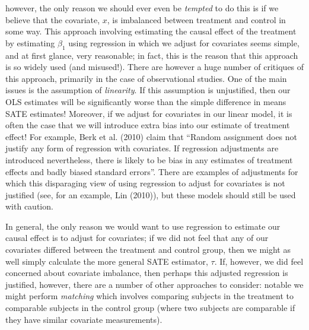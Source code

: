 however, the only reason we should ever even be \textit{tempted} to do this is if we believe that the covariate, $x$, is imbalanced between treatment and control in some way. This approach involving estimating the causal effect of the treatment by estimating $\beta_1$ using regression in which we adjust for covariates seems simple, and at first glance, very reasonable; in fact, this is the reason that this approach is so widely used (and misused!). There are however a huge number of critiques of this approach, primarily in the case of observational studies. One of the main issues is the assumption of \textit{linearity}. If this assumption is unjustified, then our OLS estimates will be significantly worse than the simple difference in means SATE estimates! Moreover, if we adjust for covariates in our linear model, it is often the case that we will introduce extra bias into our estimate of treatment effect! For example, Berk et al. (2010) claim that ``Random assignment does not justify any form of regression with covariates. If regression adjustments are introduced nevertheless, there is likely to be bias in any estimates of treatment effects and badly biased standard errors''. There are examples of adjustments for which this disparaging view of using regression to adjust for covariates is not justified (see, for an example, Lin (2010)), but these models should still be used with caution.

In general, the only reason we would want to use regression to estimate our causal effect is to adjust for covariates; if we did not feel that any of our covariates differed between the treatment and control group, then we might as well simply calculate the more general SATE estimator, $\tau$. If, however, we did feel concerned about covariate imbalance, then perhaps this adjusted regression is justified, however, there are a number of other approaches to consider: notable we might perform \textit{matching} which involves comparing subjects in the treatment to comparable subjects in the control group (where two subjects are comparable if they have similar covariate measurements).






